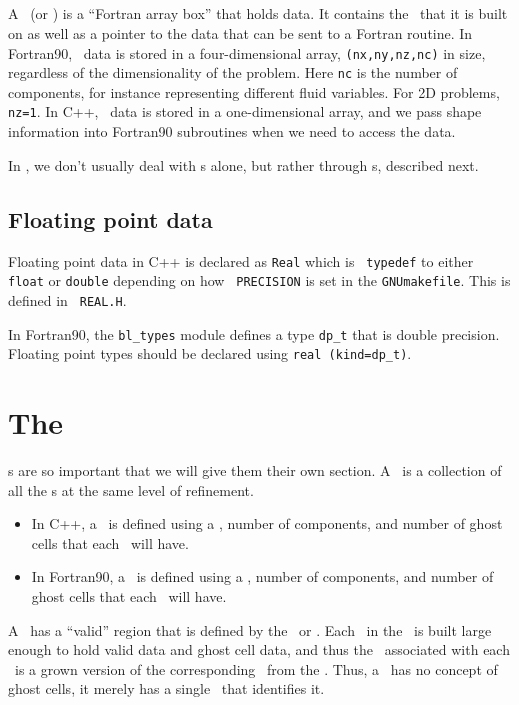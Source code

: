 \subsection{\FArrayBox}

A \FArrayBox\ (or \Fab) is a ``Fortran array box'' that holds data.  It contains the
\BoxType\ that it is built on as well as a pointer to the data 
that can be sent to a Fortran routine.
In Fortran90, \Fab\ data is stored in a four-dimensional array,
{\tt (nx,ny,nz,nc)} in size, regardless of the dimensionality of the
problem.  Here {\tt nc} is the number of components, for instance
representing different fluid variables.  For 2D problems, {\tt nz=1}.
In C++, \Fab\ data is stored in a one-dimensional array, and we pass
shape information into Fortran90 subroutines when we need to access
the data.

In \BoxLib, we don't usually deal with 
\Fab s alone, but rather through \MultiFab s, described next.

\subsection{Floating point data}

Floating point data in C++ is declared as {\tt Real} which is {\tt
typedef} to either {\tt float} or {\tt double} depending on how {\tt
PRECISION} is set in the {\tt GNUmakefile}.  This is defined in {\tt
REAL.H}.

In Fortran90, the {\tt bl\_types} module defines a type {\tt dp\_t} that
is double precision.  Floating point types should be declared using
{\tt real (kind=dp\_t)}.


\section{The \MultiFab}
\MultiFab s are so important that we will give them their own section.
A \MultiFab\ is a collection of all the \Fab s at the same level of
refinement.
\begin{itemize}
\item In C++, a \MultiFab\ is defined using a \BoxArray,
number of components, and number of ghost cells that each \Fab\
will have.
\item In Fortran90, a \MultiFab\ is defined using a \layout,
number of components, and number of ghost cells that each \Fab\
will have.
\end{itemize}
A \MultiFab\ has a ``valid'' region that is defined by 
the \BoxArray~or \layout.  Each \Fab\ in the \MultiFab\ is built large enough 
to hold valid data and ghost cell data, and thus the \BoxType\ associated with
each \Fab\ is a grown version of the corresponding \BoxType\ from the \BoxArray.
Thus, a \Fab\ has no concept 
of ghost cells, it merely has a single \BoxType\ that identifies it.\\

